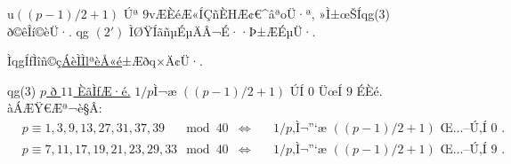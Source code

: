 \documentclass{jsarticle}
\theoremstyle{definition}
\begin{document}
u$((p-1)/2+1)$ Úª $9$vÆÈéÆ«ÍÇñÈHÆ¢€^âªoÜ·ª, »Ì±œŠÍqg(3) ð©êÎí©èÜ·.
qg $(2')$ ÌØŸÍãñµÉµÄÂ¬É··Þ±ÆÉµÜ·.
\begin{center}
\end{center}

ÌqgÍfÌîñ©ç\underline{ÁèÌÌlªèÅ«é}±Æðq×Ä¢Ü·.
\begin{itembox}[|]{qg(3)}
\underline{$p$ ð $11$ ÈãÌfÆ·é.} $1/p$Ì¬æ $((p-1)/2+1)$ ÚÍ $0$ ÜœÍ $9$ ÉÈé.
àÁÆŸ€Æª¬è§Â:
\begin{align*}
&p\equiv 1,3,9,13,27,31,37,39\quad\mod 40 &\Longleftrightarrow   &\quad\text{$1/p$Ì¬æ $((p-1)/2+1)$ ÚÍ $0$ .}
\\
&p\equiv 7,11,17,19,21,23,29,33\mod 40 &\Longleftrightarrow   &\quad\text{$1/p$Ì¬æ $((p-1)/2+1)$ ÚÍ $9$ .}
\end{align*}
\end{itembox}
\end{document}
